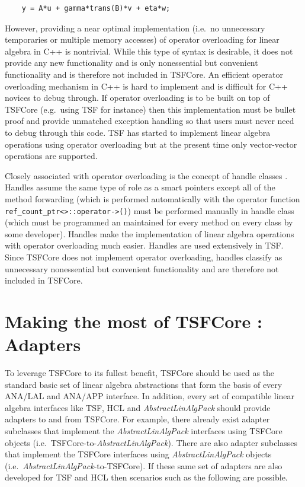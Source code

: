 \begin{verbatim}
    y = A*u + gamma*trans(B)*v + eta*w;
\end{verbatim}

However, providing a near optimal implementation (i.e.~no unnecessary
temporaries or multiple memory accesses) of operator overloading for
linear algebra in C++ is nontrivial.  While this type of syntax is
desirable, it does not provide any new functionality and is only
nonessential but convenient functionality and is therefore not included in TSFCore.
An efficient operator overloading mechanism in C++ is hard to
implement and is difficult for C++ novices to debug through.  If
operator overloading is to be built on top of TSFCore (e.g.~using TSF for
instance) then this implementation must be bullet proof and provide
unmatched exception handling so that users must never need to debug
through this code.  TSF has started to implement linear algebra
operations using operator overloading but at the present time only
vector-vector operations are supported.

Closely associated with operator overloading is the concept of handle
classes \cite{ref:advanced_c++_coplien}.  Handles assume the same type
of role as a smart pointers except all of the method forwarding (which
is performed automatically with the operator function
\texttt{ref\_count\_ptr<>\-::operator->()}) must be performed manually
in handle class (which must be programmed an maintained for every
method on every class by some developer).  Handles make the
implementation of linear algebra operations with operator overloading
much easier.  Handles are used extensively in TSF.  Since TSFCore does
not implement operator overloading, handles classify as unnecessary
nonessential but convenient functionality and are therefore not included in TSFCore.

%
\section{Making the most of TSFCore : Adapters}
\label{tsfcore:sec:adapters}
%

To leverage TSFCore to its fullest benefit, TSFCore should be used as the
standard basic set of linear algebra abstractions that form the basis of
every ANA/LAL and ANA/APP interface.  In addition, every set of
compatible linear algebra interfaces like TSF, HCL and
\textit{AbstractLinAlgPack} should provide adapters to and from TSFCore.
For example, there already exist adapter subclasses that implement the
\textit{AbstractLinAlgPack} interfaces using TSFCore objects
(i.e.~TSFCore-to-\textit{AbstractLinAlgPack}).  There are also adapter
subclasses that implement the TSFCore interfaces using
\textit{AbstractLinAlgPack} objects
(i.e.~\textit{AbstractLinAlgPack}-to-TSFCore).  If these same set of
adapters are also developed for TSF and HCL then scenarios such as the
following are possible.

